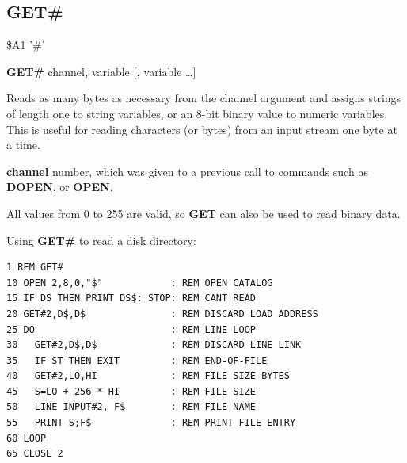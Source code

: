 \subsection{GET\#}
\begin{description}[leftmargin=2cm,style=nextline]
\item [Token:] \$A1 '\#'
\item [Format:] {\bf GET\#} channel{\bf,} variable [{\bf,} variable \dots]
\item [Usage:] Reads as many bytes
               as necessary from the channel argument
               and assigns strings of length one to
               string variables, or an 8-bit binary value
               to numeric variables.
               This is useful for reading characters (or bytes) from
               an input stream one byte at a time.

               {\bf channel} number, which was given to a previous
               call to commands such as {\bf DOPEN}, or {\bf OPEN}.


\item [Remarks:] All values from 0 to 255 are valid, so {\bf GET}
                 can also be used to read binary data.

\item [Example:] Using {\bf GET\#} to read a disk directory:
\begin{tcolorbox}[colback=black,coltext=white]
\verbatimfont{\codefont}
\begin{verbatim}
1 REM GET#
10 OPEN 2,8,0,"$"            : REM OPEN CATALOG
15 IF DS THEN PRINT DS$: STOP: REM CANT READ
20 GET#2,D$,D$               : REM DISCARD LOAD ADDRESS
25 DO                        : REM LINE LOOP
30   GET#2,D$,D$             : REM DISCARD LINE LINK
35   IF ST THEN EXIT         : REM END-OF-FILE
40   GET#2,LO,HI             : REM FILE SIZE BYTES
45   S=LO + 256 * HI         : REM FILE SIZE
50   LINE INPUT#2, F$        : REM FILE NAME
55   PRINT S;F$              : REM PRINT FILE ENTRY
60 LOOP
65 CLOSE 2
\end{verbatim}
\end{tcolorbox}
\end{description}


\newpage
